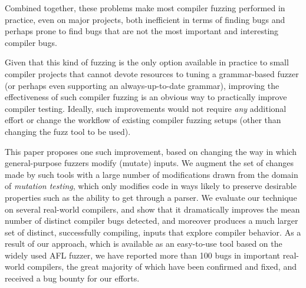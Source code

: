   Combined together, these problems make most compiler fuzzing
  performed in practice, even on major projects, both inefficient in
  terms of finding bugs and perhaps prone to find bugs that are not
  the most important and interesting compiler bugs.

  Given that this kind of fuzzing is the only option available in
  practice to small compiler projects that cannot devote resources to
  tuning a grammar-based fuzzer (or perhaps even supporting an
  always-up-to-date grammar), improving the effectiveness of such
  compiler fuzzing is an obvious way to practically improve compiler
  testing.  Ideally, such improvements would not require \emph{any}
  additional effort or change the workflow of existing compiler
  fuzzing setups (other than changing the fuzz tool to be used).

  This paper proposes one such improvement, based on changing the way
  in which general-purpose fuzzers modify (mutate) inputs.  We augment
  the set of changes made by such tools with a large number of
  modifications drawn from the domain of \emph{mutation testing},
  which only modifies code in ways likely to preserve desirable
  properties such as the ability to get through a parser.  We evaluate
  our technique on several real-world compilers, and show that it
  dramatically improves the mean number of distinct compiler bugs
  detected, and moreover produces a much larger set of distinct,
  successfully compiling, inputs that explore compiler behavior.  As a
  result of our approach, which is available as an easy-to-use tool
  based on the widely used AFL fuzzer, we have reported more than 100
  bugs in important real-world compilers, the great majority of
  which have been confirmed and fixed, and received a bug bounty for
  our efforts.